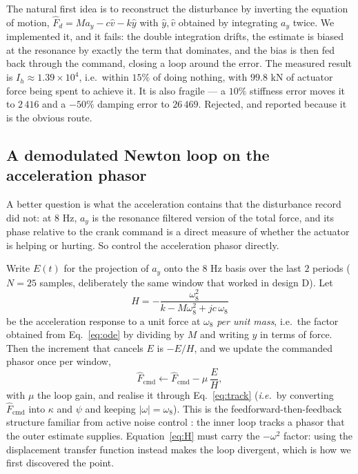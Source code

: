 \documentclass[12pt]{apmcmthesis}
\begin{document}
The natural first idea is to reconstruct the disturbance by inverting the equation of motion,
$\hat F_d=M a_y-c\hat v-k\hat y$ with $\hat y,\hat v$ obtained by integrating $a_y$ twice. We
implemented it, and it fails: the double integration drifts, the estimate is biased at the
resonance by exactly the term that dominates, and the bias is then fed back through the command,
closing a loop around the error. The measured result is $I_h\approx1.39\times10^4$, i.e.\ within
$15\%$ of doing nothing, with $99.8$ kN of actuator force being spent to achieve it. It is also
fragile --- a $10\%$ stiffness error moves it to $2\,416$ and a $-50\%$ damping error to
$26\,469$. Rejected, and reported because it is the obvious route.

\subsection{A demodulated Newton loop on the acceleration phasor}
A better question is what the acceleration contains that the disturbance record did not: at
$8$ Hz, $a_y$ is the resonance filtered version of the total force, and its phase relative to the
crank command is a direct measure of whether the actuator is helping or hurting. So control the
acceleration phasor directly.

Write $E(t)$ for the projection of $a_y$ onto the $8$ Hz basis over the last $2$ periods
($N=25$ samples, deliberately the same window that worked in design D). Let
\begin{equation}
H=-\frac{\omega_8^2}{k-M\omega_8^2+jc\,\omega_8}
\label{eq:H}
\end{equation}
be the acceleration response to a unit force at $\omega_8$ \emph{per unit mass}, i.e.\ the factor
obtained from Eq.~\eqref{eq:ode} by dividing by $M$ and writing $y$ in terms of force. Then the
increment that cancels $E$ is $-E/H$, and we update the commanded phasor once per window,
\begin{equation}
\hat F_{\text{cmd}}\leftarrow \hat F_{\text{cmd}}-\mu\,\frac{E}{H},
\label{eq:newton}
\end{equation}
with $\mu$ the loop gain, and realise it through Eq.~\eqref{eq:track} (\emph{i.e.}\ by converting
$\hat F_{\text{cmd}}$ into $\kappa$ and $\psi$ and keeping $|\omega|=\omega_8$). This is the
feedforward-then-feedback structure familiar from active noise control \cite{kuo}: the inner loop
tracks a phasor that the outer estimate supplies. Equation~\eqref{eq:H}
must carry the $-\omega^2$ factor: using the displacement transfer function instead makes the loop
divergent, which is how we first discovered the point.
\end{document}
